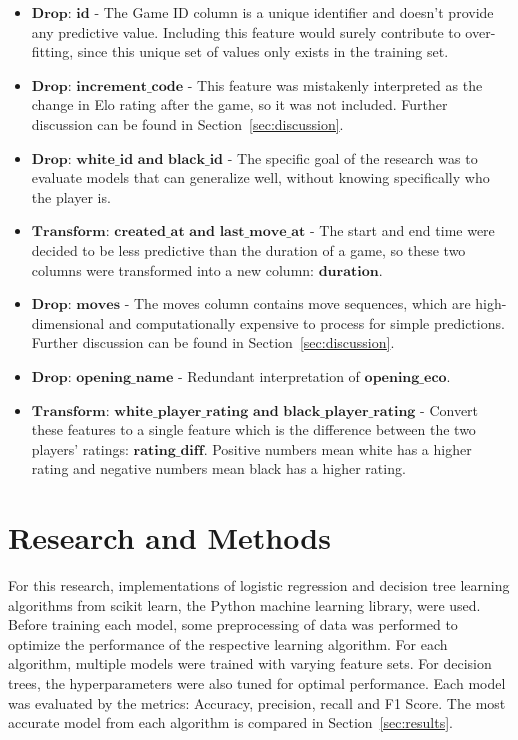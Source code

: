 \documentclass[12pt]{article}
\begin{document}
\begin{itemize}[label={}, leftmargin=0pt]
  \item $\textbf{Drop: id}$ - The Game ID column is a unique identifier and doesn’t provide any predictive value. Including this feature would surely contribute to over-fitting, since this unique set of values only exists in the training set.
  \item $\textbf{Drop: increment\_code}$ - This feature was mistakenly interpreted as the change in Elo rating after the game, so it was not included. Further discussion can be found in Section~\ref{sec:discussion}.
  \item $\textbf{Drop: white\_id and black\_id}$ - The specific goal of the research was to evaluate models that can generalize well, without knowing specifically who the player is.
  \item $\textbf{Transform: created\_at and last\_move\_at}$ - The start and end time were decided to be less predictive than the duration of a game, so these two columns were transformed into a new column: $\textbf{duration}$.
  \item $\textbf{Drop: moves}$ - The moves column contains move sequences, which are high-dimensional and computationally expensive to process for simple predictions. Further discussion can be found in Section~\ref{sec:discussion}.
  \item $\textbf{Drop: opening\_name}$ - Redundant interpretation of $\textbf{opening\_eco}$.
  \item $\textbf{Transform: white\_player\_rating and black\_player\_rating}$ - Convert these features to a single feature which is the difference between the two players' ratings: $\textbf{rating\_diff}$. Positive numbers mean white has a higher rating and negative numbers mean black has a higher rating.
\end{itemize}

\section{Research and Methods}
\label{sec:methods}
For this research, implementations of logistic regression and decision tree learning algorithms from scikit learn, the Python machine learning library, were used. Before training each model, some preprocessing of data was performed to optimize the performance of the respective learning algorithm. For each algorithm, multiple models were trained with varying feature sets. For decision trees, the hyperparameters were also tuned for optimal performance. Each model was evaluated by the metrics: Accuracy, precision, recall and F1 Score. The most accurate model from each algorithm is compared in Section~\ref{sec:results}.
\end{document}
